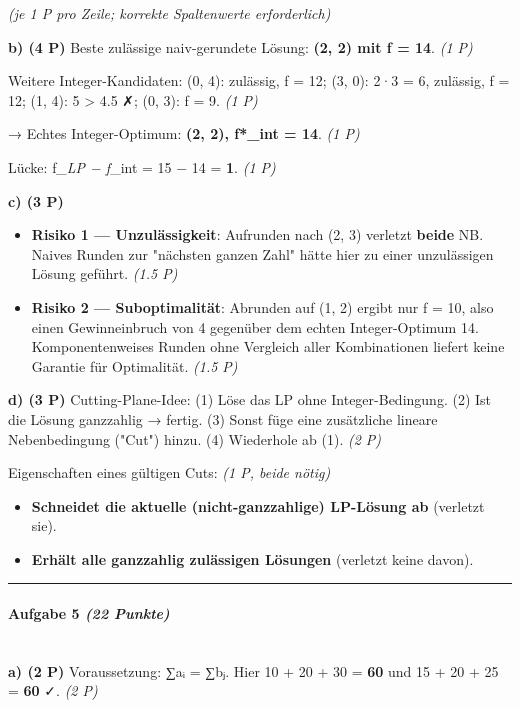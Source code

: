 \documentclass[11pt, a4paper]{article}
\begin{document}
\textit{(je 1 P pro Zeile; korrekte Spaltenwerte erforderlich)}


\textbf{b) (4 P)} Beste zulässige naiv-gerundete Lösung: \textbf{(2, 2) mit f = 14}. \textit{(1 P)}

Weitere Integer-Kandidaten: (0, 4): zulässig, f = 12; (3, 0): 2·3 = 6, zulässig, f = 12; (1, 4): 5 > 4.5 ✗; (0, 3): f = 9. \textit{(1 P)}

→ Echtes Integer-Optimum: \textbf{(2, 2), f*\_int = 14}. \textit{(1 P)}

Lücke: f\textit{\_LP − f}\_int = 15 − 14 = \textbf{1}. \textit{(1 P)}


\textbf{c) (3 P)}

\begin{itemize}
  \item \textbf{Risiko 1 — Unzulässigkeit}: Aufrunden nach (2, 3) verletzt \textbf{beide} NB. Naives Runden zur "nächsten ganzen Zahl" hätte hier zu einer unzulässigen Lösung geführt. \textit{(1.5 P)}
  \item \textbf{Risiko 2 — Suboptimalität}: Abrunden auf (1, 2) ergibt nur f = 10, also einen Gewinneinbruch von 4 gegenüber dem echten Integer-Optimum 14. Komponentenweises Runden ohne Vergleich aller Kombinationen liefert keine Garantie für Optimalität. \textit{(1.5 P)}
\end{itemize}

\textbf{d) (3 P)} Cutting-Plane-Idee: (1) Löse das LP ohne Integer-Bedingung. (2) Ist die Lösung ganzzahlig → fertig. (3) Sonst füge eine zusätzliche lineare Nebenbedingung ("Cut") hinzu. (4) Wiederhole ab (1). \textit{(2 P)}


Eigenschaften eines gültigen Cuts: \textit{(1 P, beide nötig)}

\begin{itemize}
  \item \textbf{Schneidet die aktuelle (nicht-ganzzahlige) LP-Lösung ab} (verletzt sie).
  \item \textbf{Erhält alle ganzzahlig zulässigen Lösungen} (verletzt keine davon).
\end{itemize}


\noindent\textcolor{rulegray}{\rule{\linewidth}{0.4pt}}


\paragraph{Aufgabe 5 \textit{(22 Punkte)}}\mbox{}\\[2pt]

\textbf{a) (2 P)} Voraussetzung: ∑aᵢ = ∑bⱼ. Hier 10 + 20 + 30 = \textbf{60} und 15 + 20 + 25 = \textbf{60} ✓. \textit{(2 P)}
\end{document}
